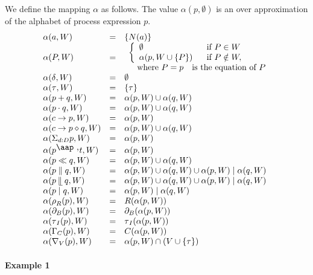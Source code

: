 \documentclass{article}
\begin{document}
We define the mapping $\alpha $ as follows. The value $\alpha (p,\emptyset )$
is an over approximation of the alphabet of process expression $p$.%
\[
\begin{array}{lll}
\alpha (a,W) & = & \{N(a)\} \\ 
\alpha (P,W) & = & 
\begin{array}{l}
\left\{ 
\begin{array}{ll}
\emptyset & \text{if }P\in W \\ 
\alpha (p,W\cup \{P\}) & \text{if }P\notin W,%
\end{array}%
\right. \\ 
\text{ where }P=p\text{ is the equation of }P%
\end{array}
\\ 
\alpha (\delta ,W) & = & \emptyset \\ 
\alpha (\tau ,W) & = & \{\tau \} \\ 
\alpha (p+q,W) & = & \alpha (p,W)\cup \alpha (q,W) \\ 
\alpha (p\cdot q,W) & = & \alpha (p,W)\cup \alpha (q,W) \\ 
\alpha (c\rightarrow p,W) & = & \alpha (p,W) \\ 
\alpha (c\rightarrow p\diamond q,W) & = & \alpha (p,W)\cup \alpha (q,W) \\ 
\alpha (\Sigma _{d:D}p,W) & = & \alpha (p,W) \\ 
\alpha (p^{\mathbin{\mbox{\aap
,}}}t,W) & = & \alpha (p,W) \\ 
\alpha (p\ll q,W) & = & \alpha (p,W)\cup \alpha (q,W) \\ 
\alpha (p\parallel q,W) & = & \alpha (p,W)\cup \alpha (q,W)\cup \alpha
(p,W)\mid \alpha (q,W) \\ 
\alpha (p\mathbin{\mathrel{\llfloor}}q,W) & = & \alpha (p,W)\cup \alpha
(q,W)\cup \alpha (p,W)\mid \alpha (q,W) \\ 
\alpha (p\mid q,W) & = & \alpha (p,W)\mid \alpha (q,W) \\ 
\alpha (\rho _{R}(p),W) & = & R(\alpha (p,W)) \\ 
\alpha (\partial _{B}(p),W) & = & \partial _{B}(\alpha (p,W)) \\ 
\alpha (\tau _{I}(p),W) & = & \tau _{I}(\alpha (p,W)) \\ 
\alpha (\Gamma _{C}(p),W) & = & C(\alpha (p,W)) \\ 
\alpha (\nabla _{V}(p),W) & = & \alpha (p,W)\cap (V\cup \{\tau \})%
\end{array}%
\]

\paragraph{Example 1}
\end{document}
